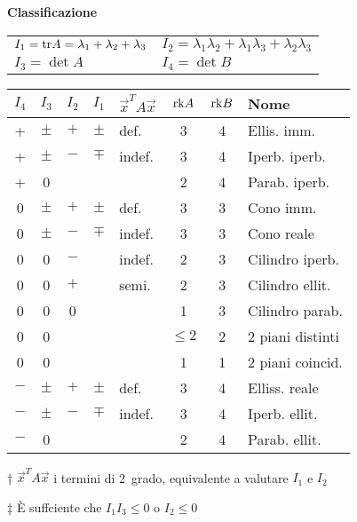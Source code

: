 \textbf{Classificazione}
\begin{tabular}{ll}
	$I_1=\mathrm{tr} A = \lambda_1+\lambda_2+\lambda_3$ & $I_2=\lambda_1\lambda_2+\lambda_1\lambda_3+\lambda_2\lambda_3$ \\
	$I_3 = \det A$ & $I_4 = \det B$
\end{tabular}

{
\begin{threeparttable}
\setlength{\tabcolsep}{0.5em}%
\begin{tabular}{c|c|c|c|l|c|c|l}
	\boldmath$I_4$
	         & \boldmath$I_3$
	                 & \boldmath$I_2$
	                       & \boldmath$I_1$
	                               & \boldmath$\vec{x}^TA\vec{x}$\tnote{†}
	                                          & \boldmath$\mathrm{rk} A$
	                                              & \boldmath$\mathrm{rk} B$
	                                                     & \textbf{Nome} \\
	\hline
	+        & $\pm$ & $+$ & $\pm$ & def.     & 3 & 4    & Ellis. imm. \\
	+        & $\pm$ & $-$\tnote{‡} & $\mp$ & indef.   & 3 & 4    & Iperb. iperb. \\
	+        & 0     &     &       &          & 2 & 4    & Parab. iperb. \\
	\hline
	0        & $\pm$ & $+$ & $\pm$ & def.     & 3 & 3    & Cono imm. \\
	0        & $\pm$ & $-$ & $\mp$ & indef.   & 3 & 3    & Cono reale \\
	0        & 0     & $-$ &       & indef.    & 2 & 3    & Cilindro iperb. \\
	0        & 0     & $+$ &       & semi.   & 2 & 3    & Cilindro ellit. \\
	0        & 0     & 0   &       &          & 1 & 3    & Cilindro parab. \\
	0        & 0     &     &       &          & $\le 2$ & 2    & 2 piani distinti \\
	0        & 0     &     &       &          & 1 & 1    & 2 piani coincid. \\
	\hline
	$-$      & $\pm$ & $+$ & $\pm$ & def.     & 3 & 4    & Elliss. reale \\
	$-$      & $\pm$ & $-$\tnote{‡} & $\mp$ & indef.   & 3 & 4    & Iperb. ellit. \\
	$-$      & 0     &     &       &          & 2 & 4    & Parab. ellit. \\
\end{tabular}
\begin{tablenotes}
	\item[†] $\vec{x}^TA\vec{x}$ i termini di 2\textdegree\ grado, equivalente a valutare $I_1$ e $I_2$
	\item[‡] È suffciente che $I_1I_3 \le 0$ o $I_2 \le 0$
\end{tablenotes}
\end{threeparttable}
}
